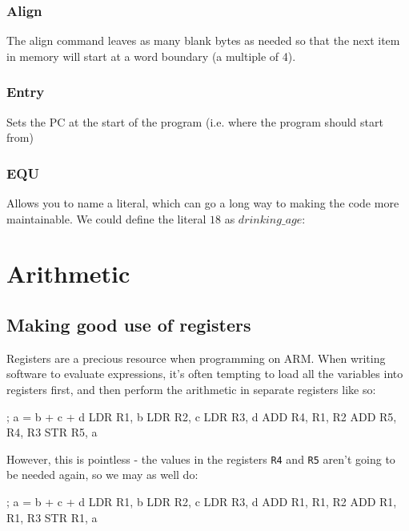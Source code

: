 \subsubsection{Align}
\label{subsubsec:align}

The align command leaves as many blank bytes as needed so that the next item in
memory will start at a word boundary (a multiple of 4).

\subsubsection{Entry}

Sets the PC at the start of the program (i.e. where the program should start
from)

\subsubsection{EQU}

Allows you to name a literal, which can go a long way to making the code more
maintainable. We could define the literal $18$ as $drinking\_age$:


\section{Arithmetic}

\subsection{Making good use of registers}

Registers are a precious resource when programming on ARM. When writing software
to evaluate expressions, it's often tempting to load all the variables into
registers first, and then perform the arithmetic in separate registers like so:

\begin{listing}{1}
	; a = b + c + d
	LDR 	R1, b
	LDR 	R2, c
	LDR 	R3, d
	ADD 	R4, R1, R2
	ADD 	R5, R4, R3
	STR 	R5, a
\end{listing}

However, this is pointless - the values in the registers {\tt R4} and {\tt R5}
aren't going to be needed again, so we may as well do:

\begin{listing}{1}
; a = b + c + d
LDR 	R1, b
LDR 	R2, c
LDR 	R3, d
ADD 	R1, R1, R2
ADD 	R1, R1, R3
STR 	R1, a
\end{listing}

